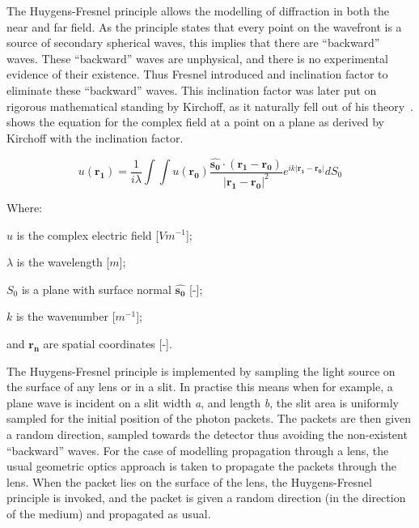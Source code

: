 The Huygens-Fresnel principle allows the modelling of diffraction in both the near and far field.
As the principle states that every point on the wavefront is a source of secondary spherical waves, this implies that there are ``backward'' waves.
These ``backward'' waves are unphysical, and there is no experimental evidence of their existence.
Thus Fresnel introduced and inclination factor to eliminate these ``backward'' waves.
This inclination factor was later put on rigorous mathematical standing by Kirchoff, as it naturally fell out of his theory~\cite{kirchhoff1883ann,born2000principles}.
 shows the equation for the complex field at a point on a plane as derived by Kirchoff with the inclination factor.

\begin{equation}
u(\mathbf{r_1})=\frac{1}{i\lambda}\int\int u(\mathbf{r_0})\frac{\mathbf{\hat{s_0}} \cdot (\mathbf{r_1} - \mathbf{r_0})}{\left|\mathbf{r_1} - \mathbf{r_0}\right|^2}e^{ik\left|\mathbf{r_1} - \mathbf{r_0}\right|}dS_0
\label{eqn:kirchhoffeqn}
\end{equation}

\noindent Where:

    \indent $u$ is the complex electric field [$Vm^{-1}$];

    \indent $\lambda$ is the wavelength [$m$];

    \indent $S_0$ is a plane with surface normal $\mathbf{\hat{s_0}}$ [-];

    \indent $k$ is the wavenumber [$m^{-1}$];

    \indent and $\mathbf{r_n}$ are spatial coordinates [-]. 

\medskip

The Huygens-Fresnel principle is implemented by sampling the light source on the surface of any lens or in a slit.
In practise this means when for example, a plane wave is incident on a slit width \textit{a}, and length \textit{b}, the slit area is uniformly sampled for the initial position of the photon packets.
The packets are then given a random direction, sampled towards the detector thus avoiding the non-existent ``backward'' waves.
For the case of modelling propagation through a lens, the usual geometric optics approach is taken to propagate the packets through the lens.
When the packet lies on the surface of the lens, the Huygens-Fresnel principle is invoked, and the packet is given a random direction (in the direction of the medium) and propagated as usual.

\medskip


